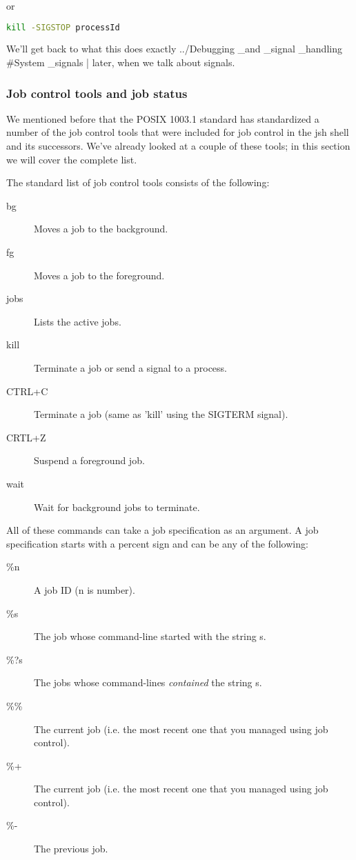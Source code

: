 or 
\lstset{basicstyle=\scriptsize, numbers=left, captionpos=b, tabsize=4}
\begin{lstlisting}[language={bash},
xleftmargin=15pt]
kill -SIGSTOP processId
\end{lstlisting}

We'll get back to what this does exactly
../Debugging \_and \_signal \_handling \#System \_signals | later, when we talk about
signals.

\subsubsection{Job control tools and job status}
We mentioned before that the POSIX 1003.1 standard has standardized a number of
the job control tools that were included for job control in the jsh shell and
its successors. We've already looked at a couple of these tools; in this
section we will cover the complete list.

The standard list of job control tools consists of the following:

\begin{description}
\item[bg]Moves a job to the background.
\item[fg]Moves a job to the foreground.
\item[jobs]Lists the active jobs.
\item[kill]Terminate a job or send a signal to a process.
\item[CTRL+C]Terminate a job (same as 'kill' using the SIGTERM signal).
\item[CRTL+Z]Suspend a foreground job.
\item[wait]Wait for background jobs to terminate.
\end{description}

All of these commands can take a job specification as an argument. A job
specification starts with a percent sign and can be any of the following:

\begin{description}
\item[\%n]A job ID (n is  number).
\item[\%s]The job whose command-line started with the string s.
\item[\%?s]The jobs whose command-lines \textit{contained} the string s.
\item[\%\%]The current job (i.e. the most recent one that you managed using job control).
\item[\%+]The current job (i.e. the most recent one that you managed using job control).
\item[\%-]The previous job.
\end{description}

